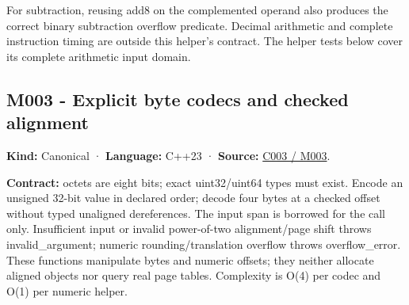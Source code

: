 For subtraction, reusing add8 on the complemented operand also produces the correct binary subtraction overflow predicate. Decimal arithmetic and complete instruction timing are outside this helper's contract. The helper tests below cover its complete arithmetic input domain.

\subsection{M003 - Explicit byte codecs and checked alignment}\label{appendix-4e2236f53445-m003---explicit-byte-codecs-and-checked-alignment}

\hypertarget{appendix-4e2236f53445-m003---explicit-byte-codecs-and-checked-alignment}{}

\textbf{Kind:} Canonical · \textbf{Language:} C++23 · \textbf{Source:} \hyperref[01-foundations-i-ch002-where-the-bytes-live]{C003 / M003}.

\textbf{Contract:} octets are eight bits; exact uint32/uint64 types must exist. Encode an unsigned 32-bit value in declared order; decode four bytes at a checked offset without typed unaligned dereferences. The input span is borrowed for the call only. Insufficient input or invalid power-of-two alignment/page shift throws invalid\_argument; numeric rounding/translation overflow throws overflow\_error. These functions manipulate bytes and numeric offsets; they neither allocate aligned objects nor query real page tables. Complexity is O(4) per codec and O(1) per numeric helper.

